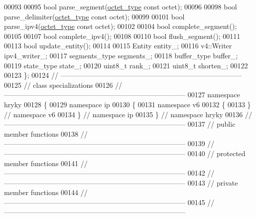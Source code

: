 \begin{DoxyCode}
00093 
00095     \textcolor{keywordtype}{bool} parse\_segment(\hyperlink{namespacehryky_a488cba8b666be33ccca70e819684e3c8}{octet_type} \textcolor{keyword}{const} octet);
00096 
00098     \textcolor{keywordtype}{bool} parse\_delimiter(\hyperlink{namespacehryky_a488cba8b666be33ccca70e819684e3c8}{octet_type} \textcolor{keyword}{const} octet);
00099 
00101     \textcolor{keywordtype}{bool} parse\_ipv4(\hyperlink{namespacehryky_a488cba8b666be33ccca70e819684e3c8}{octet_type} \textcolor{keyword}{const} octet);
00102 
00104     \textcolor{keywordtype}{bool} complete\_segment();
00105 
00107     \textcolor{keywordtype}{bool} complete\_ipv4();
00108 
00110     \textcolor{keywordtype}{bool} flush\_segment();
00111 
00113     \textcolor{keywordtype}{bool} update\_entity();
00114 
00115     Entity          entity\_;
00116     v4::Writer      ipv4\_writer\_;
00117     segments\_type   segments\_;
00118     buffer\_type     buffer\_;
00119     state\_type      state\_;
00120     uint8\_t         rank\_;
00121     uint8\_t         shorten\_;
00122 
00123 \};
00124 \textcolor{comment}{//
      ------------------------------------------------------------------------------}
00125 \textcolor{comment}{// class specializations}
00126 \textcolor{comment}{//
      ------------------------------------------------------------------------------}
00127 \textcolor{keyword}{namespace }hryky
00128 \{
00129 \textcolor{keyword}{namespace }ip
00130 \{
00131 \textcolor{keyword}{namespace }v6
00132 \{
00133 \} \textcolor{comment}{// namespace v6}
00134 \} \textcolor{comment}{// namespace ip}
00135 \} \textcolor{comment}{// namespace hryky}
00136 \textcolor{comment}{//
      ------------------------------------------------------------------------------}
00137 \textcolor{comment}{// public member functions}
00138 \textcolor{comment}{//
      ------------------------------------------------------------------------------}
00139 \textcolor{comment}{//
      ------------------------------------------------------------------------------}
00140 \textcolor{comment}{// protected member functions}
00141 \textcolor{comment}{//
      ------------------------------------------------------------------------------}
00142 \textcolor{comment}{//
      ------------------------------------------------------------------------------}
00143 \textcolor{comment}{// private member functions}
00144 \textcolor{comment}{//
      ------------------------------------------------------------------------------}
00145 \textcolor{comment}{//
      ------------------------------------------------------------------------------}

\end{DoxyCode}
